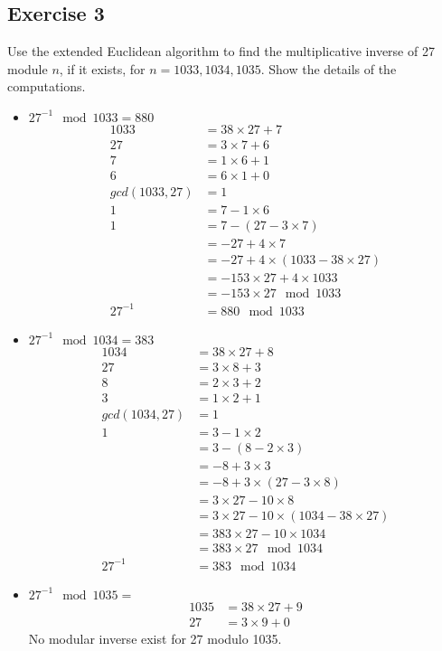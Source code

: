 \documentclass{math}
\begin{document}
\subsection*{Exercise 3}
Use the extended Euclidean algorithm to find the multiplicative inverse of
27 module \( n \), if it exists, for \( n = 1033, 1034, 1035 \). Show the
details of the computations.
\begin{itemize}
  \item \( 27^{-1}\mod1033 = 880 \)
  \begin{align*}
    1033 &= 38\times27+7 \\
    27 &= 3\times7+6 \\
    7 &= 1\times6+1 \\
    6 &= 6\times1+0 \\
    gcd(1033,27) &= 1 \\
    1 &= 7-1\times6 \\
    1 &= 7-(27-3\times7) \\
    &= -27+4\times7 \\
    &= -27+4\times(1033-38\times27) \\
    &= -153\times27+4\times1033 \\
    &= -153\times27\mod1033 \\
    27^{-1} &= 880\mod1033
  \end{align*}
  \item \( 27^{-1}\mod1034 = 383 \)
  \begin{align*}
    1034 &= 38\times27+8 \\
    27 &= 3\times8+3 \\
    8 &= 2\times3+2 \\
    3 &= 1\times2+1 \\
    gcd(1034,27) &= 1 \\
    1 &= 3-1\times2 \\
    &= 3-(8-2\times3) \\
    &= -8+3\times3 \\
    &= -8+3\times(27-3\times8) \\
    &= 3\times27-10\times8 \\
    &= 3\times27-10\times(1034-38\times27) \\
    &= 383\times27-10\times1034 \\
    &= 383\times27\mod1034 \\
    27^{-1} &= 383\mod1034
  \end{align*}
  \item \( 27^{-1}\mod1035 = \)
  \begin{align*}
    1035 &= 38\times27+9 \\
    27 &= 3\times9+0
  \end{align*}
  No modular inverse exist for 27 modulo 1035.
\end{itemize}
\end{document}
